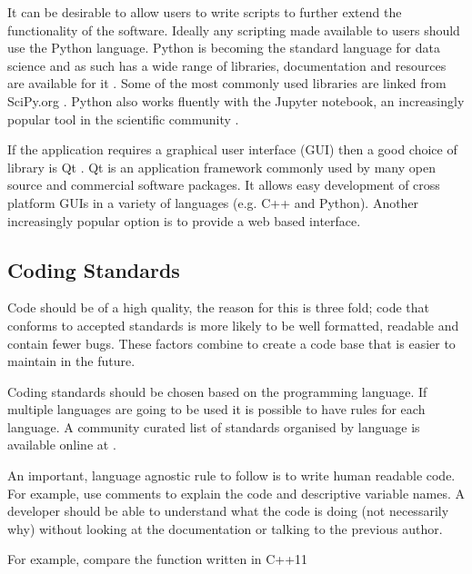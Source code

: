 \documentclass[jnr]{iosart2x}
\begin{document}
It can be desirable to allow users to write scripts to further extend the functionality of the software.
Ideally any scripting made available to users should use the Python language.
Python is becoming the standard language for data science and as such has a wide range of libraries, documentation and resources are available for it \cite{python-nature}.
Some of the most commonly used libraries are linked from SciPy.org \cite{scipy}.
Python also works fluently with the Jupyter notebook, an increasingly popular tool in the scientific community \cite{jupyter-nature}.

If the application requires a graphical user interface (GUI) then a good choice of library is Qt \cite{Qt}.
Qt is an application framework commonly used by many open source and commercial software packages.
It allows easy development of cross platform GUIs in a variety of languages (e.g. C++ and Python).
Another increasingly popular option is to provide a web based interface.

\subsection{Coding Standards}
\label{Coding standards}

Code should be of a high quality, the reason for this is three fold; code that conforms to accepted standards is more likely to be well formatted, readable and contain fewer bugs.
These factors combine to create a code base that is easier to maintain in the future.

Coding standards should be chosen based on the programming language.
If multiple languages are going to be used it is possible to have rules for each language.
A community curated list of standards organised by language is available online at \cite{Awesome_Guidelines}.

An important, language agnostic rule to follow is to write human readable code.
For example, use comments to explain the code and descriptive variable names.
A developer should be able to understand what the code is doing (not necessarily why) without looking at the documentation or talking to the previous author.

For example, compare the function \cite{Lim_2015} written in C++11
\end{document}
